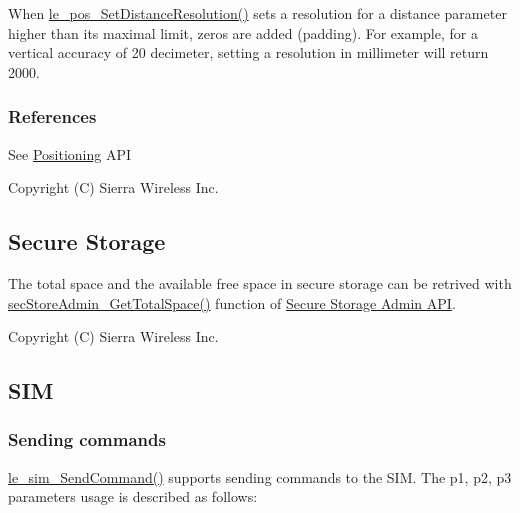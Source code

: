 When {\ttfamily \hyperlink{le__pos__interface_8h_a3e013d5f757ac82bfde049848418bfb7}{le\+\_\+pos\+\_\+\+Set\+Distance\+Resolution()}} sets a resolution for a distance parameter higher than its maximal limit, zeros are added (padding). For example, for a vertical accuracy of 20 decimeter, setting a resolution in millimeter will return 2000.\hypertarget{platformConstraintsPositioning_platformConstraintsPositioning_References}{}\subsubsection{References}\label{platformConstraintsPositioning_platformConstraintsPositioning_References}
See \hyperlink{c_pos}{Positioning} A\+PI

Copyright (C) Sierra Wireless Inc. \hypertarget{platformConstraintsSecStorage}{}\subsection{Secure Storage}\label{platformConstraintsSecStorage}
The total space and the available free space in secure storage can be retrived with \hyperlink{sec_store_admin__interface_8h_ac8eb38a1cdd75ff734a222bb129456f9}{sec\+Store\+Admin\+\_\+\+Get\+Total\+Space()} function of \hyperlink{c_secStoreAdmin}{Secure Storage Admin A\+PI}.

Copyright (C) Sierra Wireless Inc. \hypertarget{platformConstraintsSim}{}\subsection{S\+IM}\label{platformConstraintsSim}
\hypertarget{platformConstraintsSim_platformConstraintsSim_sendCmd}{}\subsubsection{Sending commands}\label{platformConstraintsSim_platformConstraintsSim_sendCmd}
\hyperlink{le__sim__interface_8h_a8bbaea044b44f8b0ebff67bf98de816a}{le\+\_\+sim\+\_\+\+Send\+Command()} supports sending commands to the S\+IM. The p1, p2, p3 parameters usage is described as follows\+:

